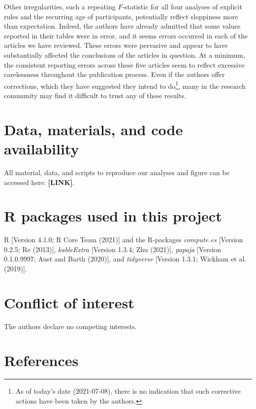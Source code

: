 \documentclass[
  english,
  man,floatsintext]{apa7}
\begin{document}
Other irregularities, such a repeating \(F\)-statistic for all four analyses of explicit rules and the recurring age of participants, potentially reflect sloppiness more than expectation. Indeed, the authors have already admitted that some values reported in their tables were in error, and it seems errors occurred in each of the articles we have reviewed. These errors were pervasive and appear to have substantially affected the conclusions of the articles in question. At a minimum, the consistent reporting errors across these five articles seem to reflect excessive carelessness throughout the publication process. Even if the authors offer corrections, which they have suggested they intend to do\footnote{As of today's date (2021-07-08), there is no indication that such corrective actions have been taken by the authors.}, many in the research community may find it difficult to trust any of these results.

\hypertarget{data-materials-and-code-availability}{%
\section{Data, materials, and code availability}\label{data-materials-and-code-availability}}

\label{sec:sharing} All material, data, and scripts to reproduce our analyses and figure can be accessed here: \textbf{{[}LINK{]}}.

\hypertarget{r-packages-used-in-this-project}{%
\section{R packages used in this project}\label{r-packages-used-in-this-project}}

R {[}Version 4.1.0; R Core Team (2021){]} and the R-packages \emph{compute.es} {[}Version 0.2.5; Re (2013){]}, \emph{kableExtra} {[}Version 1.3.4; Zhu (2021){]}, \emph{papaja} {[}Version 0.1.0.9997; Aust and Barth (2020){]}, and \emph{tidyverse} {[}Version 1.3.1; Wickham et al. (2019){]}.

\hypertarget{conflict-of-interest}{%
\section{Conflict of interest}\label{conflict-of-interest}}

The authors declare no competing interests.

\newpage

\hypertarget{references}{%
\section{References}\label{references}}
\end{document}
